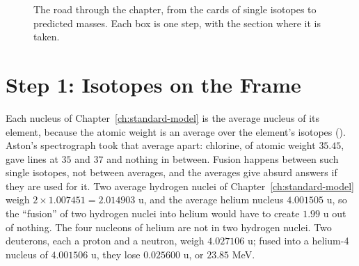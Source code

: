 \begin{figure}[tb]
\caption[The road through the chapter]{The road through the chapter, from the cards of single isotopes to predicted masses. Each box is one step, with the section where it is taken.}
\label{fig:cl-map}
\end{figure}

\section{Step 1: Isotopes on the Frame}\label{sec:cl-isotopes}

Each nucleus of Chapter~\ref{ch:standard-model} is the average nucleus of its element, because the atomic weight is an average over the element's isotopes (). Aston's spectrograph took that average apart: chlorine, of atomic weight $35.45$, gave lines at $35$ and $37$ and nothing in between. Fusion happens between such single isotopes, not between averages, and the averages give absurd answers if they are used for it. Two average hydrogen nuclei of Chapter~\ref{ch:standard-model} weigh $2 \times 1.007451 = 2.014903$ u, and the average helium nucleus $4.001505$ u, so the \enquote{fusion} of two hydrogen nuclei into helium would have to create $1.99$ u out of nothing. The four nucleons of helium are not in two hydrogen nuclei. Two deuterons, each a proton and a neutron, weigh $4.027106$ u; fused into a helium-4 nucleus of $4.001506$ u, they lose $0.025600$ u, or $23.85$ MeV.

